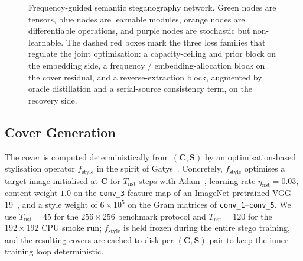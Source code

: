 \documentclass[conference]{IEEEtran}
\begin{document}
\begin{figure}[t]
\caption{Frequency-guided semantic steganography network. Green nodes are tensors, blue nodes are learnable modules, orange nodes are differentiable operations, and purple nodes are stochastic but non-learnable. The dashed red boxes mark the three loss families that regulate the joint optimisation: a capacity-ceiling and prior block on the embedding side, a frequency / embedding-allocation block on the cover residual, and a reverse-extraction block, augmented by oracle distillation and a serial-source consistency term, on the recovery side.}
\label{fig:architecture}
\end{figure}

\subsection{Cover Generation}
\label{sec:cover}
The cover is computed deterministically from $(\mathbf{C},\mathbf{S})$ by an optimisation-based stylisation operator $f_{\text{style}}$ in the spirit of Gatys~\cite{gatys}. Concretely, $f_{\text{style}}$ optimises a target image initialised at $\mathbf{C}$ for $T_{\text{nst}}$ steps with Adam~\cite{adam}, learning rate $\eta_{\text{nst}}\!=\!0.03$, content weight $1.0$ on the \texttt{conv\_3} feature map of an ImageNet-pretrained VGG-19~\cite{vgg}, and a style weight of $6\!\times\!10^{5}$ on the Gram matrices of \texttt{conv\_1}--\texttt{conv\_5}. We use $T_{\text{nst}}\!=\!45$ for the $256\!\times\!256$ benchmark protocol and $T_{\text{nst}}\!=\!120$ for the $192\!\times\!192$ CPU smoke run; $f_{\text{style}}$ is held frozen during the entire stego training, and the resulting covers are cached to disk per $(\mathbf{C},\mathbf{S})$ pair to keep the inner training loop deterministic.
\end{document}
